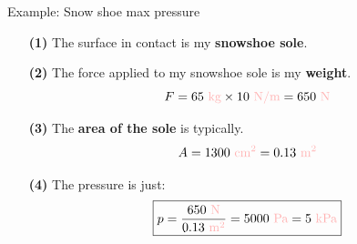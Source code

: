 \documentclass[usenames,dvipsnames]{beamer}
\begin{document}
\begin{frame}{\huge{Example: Snow shoe max pressure}}

\begin{itemize}
    \item[\bf (1)] The surface in contact is my \textbf{snowshoe sole}.
    \item[\bf (2)] The force applied to my snowshoe sole is my \textbf{weight}.
    \begin{equation*}
    F=65 \textcolor{red!30}{\text{ kg}} \times 10 \textcolor{red!30}{\text{ N/m}} = 650 \textcolor{red!30}{\text{ N}}
    \end{equation*}
    \item[\bf (3)] The \textbf{area of the sole} is typically.
    \begin{equation*}
    A= 1300 \textcolor{red!30}{\text{ cm}^2} = 0.13 \textcolor{red!30}{\text{ m}^2}
    \end{equation*}
    \item[\bf (4)] The pressure is just:
    \begin{equation*}
        \boxed{p=\frac{650\textcolor{red!30}{\text{ N}}}{0.13\textcolor{red!30}{\text{ m}^2}}= 5000 \textcolor{red!30}{\text{ Pa}}=5 \textcolor{red!30}{\text{ kPa}}}
    \end{equation*}
\end{itemize}

\end{frame}
\end{document}
